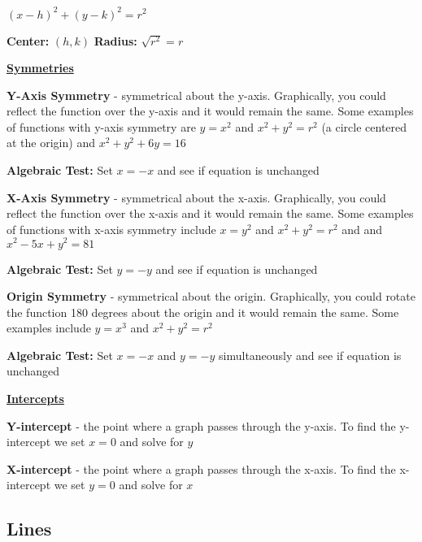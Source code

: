 \documentclass[12pt]{article}
\newenvironment{myindentpar}[1]%
     {\begin{list}{}%
             {\setlength{\leftmargin}{#1}}%
             \item[]%
     }
     {\end{list}}
\begin{document}
\centerline{$(x-h)^2+(y-k)^2=r^2$}
\vspace{.5cm}
\centerline{\textbf{Center:} $(h,k)$ \hspace{2cm} \textbf{Radius:} $\sqrt{r^2} = r$}

{\bf \underline{Symmetries}}

\begin{myindentpar}{1cm}
\textbf{Y-Axis Symmetry} - symmetrical about the y-axis. Graphically, you could reflect the function over the y-axis and it would remain the same. Some examples of functions with y-axis symmetry are $y=x^2$ and $x^2+y^2=r^2$ (a circle centered at the origin) and $x^2 + y^2 + 6y = 16$

\begin{myindentpar}{2cm}
\textbf{Algebraic Test:} Set $x = -x$ and see if equation is unchanged
\end{myindentpar}

\textbf{X-Axis Symmetry} - symmetrical about the x-axis. Graphically, you could reflect the function over the x-axis and it would remain the same. Some examples of functions with x-axis symmetry include $x=y^2$ and $x^2+y^2=r^2$ and and $x^2 -5x + y^2 = 81$

\begin{myindentpar}{2cm}
\textbf{Algebraic Test:} Set $y = -y$ and see if equation is unchanged
\end{myindentpar}


\textbf{Origin Symmetry} - symmetrical about the origin. Graphically, you could rotate the function 180 degrees about the origin and it would remain the same. Some examples include $y=x^3$ and $x^2+y^2=r^2$

\begin{myindentpar}{2cm}
\textbf{Algebraic Test:} Set $x = -x$ and $y = -y$ simultaneously and see if equation is unchanged
\end{myindentpar}

\end{myindentpar}

{\bf \underline{Intercepts}}
\begin{myindentpar}{1cm}
\textbf{Y-intercept} - the point where a graph passes through the y-axis. To find the y-intercept we set $x=0$ and solve for $y$

\textbf{X-intercept} - the point where a graph passes through the x-axis. To find the x-intercept we set $y=0$ and solve for $x$
\end{myindentpar}

\subsection{Lines}
\end{document}

